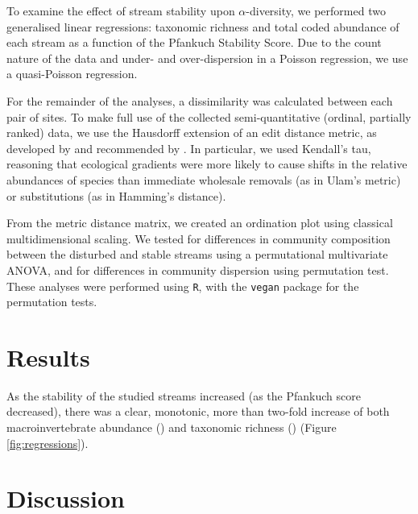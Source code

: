 \documentclass[a4paper,10pt]{article}
\newcommand\inputresults[1]{\unskip}
\begin{document}
To examine the effect of stream stability upon $\alpha$-diversity, we performed two generalised linear regressions: taxonomic richness and total coded abundance of each stream as a function of the Pfankuch Stability Score.
Due to the count nature of the data and under- and over-dispersion in a Poisson regression, we use a quasi-Poisson regression.

For the remainder of the analyses, a dissimilarity was calculated between each pair of sites.
To make full use of the collected semi-quantitative (ordinal, partially ranked) data, we use the Hausdorff extension of an edit distance metric, as developed by \textcite{critchlow} and recommended by \textcite{dissimilarity-partially-ranked}.
In particular, we used Kendall's tau, reasoning that ecological gradients were more likely to cause shifts in the relative abundances of species than immediate wholesale removals (as in Ulam's metric) or substitutions (as in Hamming's distance).

From the metric distance matrix, we created an ordination plot using classical multidimensional scaling.
We tested for differences in community composition between the disturbed and stable streams using a permutational multivariate ANOVA, and for differences in community dispersion using  permutation test.
These analyses were performed using \texttt{R}, with the \texttt{vegan} package \parencite{vegan} for the permutation tests.


\section*{Results}

As the stability of the studied streams increased (as the Pfankuch score decreased), there was a clear, monotonic, more than two-fold increase of both macroinvertebrate abundance (\inputresults{abundance-regression}) and taxonomic richness (\inputresults{richness-regression}) (Figure \ref{fig:regressions}).

\section*{Discussion}
\end{document}
